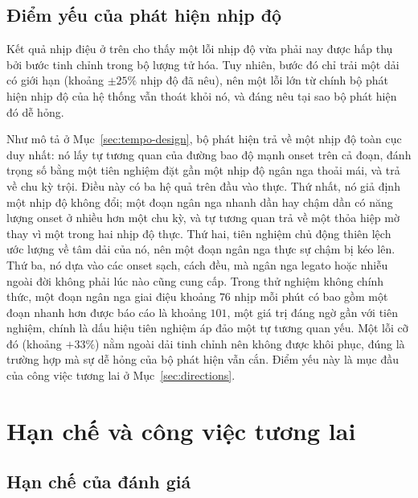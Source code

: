 \documentclass[12pt,a4paper]{article}
\begin{document}
\subsection{Điểm yếu của phát hiện nhịp độ}
\label{sec:bpm}

Kết quả nhịp điệu ở trên cho thấy một lỗi nhịp độ vừa phải nay được hấp thụ bởi bước
tinh chỉnh trong bộ lượng tử hóa. Tuy nhiên, bước đó chỉ trải một dải có giới hạn
(khoảng $\pm 25\%$ nhịp độ đã nêu), nên một lỗi lớn từ chính bộ phát hiện nhịp độ
của hệ thống vẫn thoát khỏi nó, và đáng nêu tại sao bộ phát hiện đó dễ hỏng.

Như mô tả ở Mục~\ref{sec:tempo-design}, bộ phát hiện trả về một nhịp độ toàn cục duy
nhất: nó lấy tự tương quan của đường bao độ mạnh onset trên cả đoạn, đánh trọng số
bằng một tiên nghiệm đặt gần một nhịp độ ngân nga thoải mái, và trả về chu kỳ trội.
Điều này có ba hệ quả trên đầu vào thực. Thứ nhất, nó giả định một nhịp độ không
đổi; một đoạn ngân nga nhanh dần hay chậm dần có năng lượng onset ở nhiều hơn một
chu kỳ, và tự tương quan trả về một thỏa hiệp mờ thay vì một trong hai nhịp độ thực.
Thứ hai, tiên nghiệm chủ động thiên lệch ước lượng về tâm dải của nó, nên một đoạn
ngân nga thực sự chậm bị kéo lên. Thứ ba, nó dựa vào các onset sạch, cách đều, mà
ngân nga legato hoặc nhiễu ngoài đời không phải lúc nào cũng cung cấp. Trong thử
nghiệm không chính thức, một đoạn ngân nga giai điệu khoảng $76$ nhịp mỗi phút có bao
gồm một đoạn nhanh hơn được báo cáo là khoảng $101$, một giá trị đáng ngờ gần với
tiên nghiệm, chính là dấu hiệu tiên nghiệm áp đảo một tự tương quan yếu. Một lỗi cỡ
đó (khoảng $+33\%$) nằm ngoài dải tinh chỉnh nên không được khôi phục, đúng là
trường hợp mà sự dễ hỏng của bộ phát hiện vẫn cắn. Điểm yếu này là mục đầu của công
việc tương lai ở Mục~\ref{sec:directions}.

\section{Hạn chế và công việc tương lai}

\subsection{Hạn chế của đánh giá}
\label{sec:eval-limits}
\end{document}
